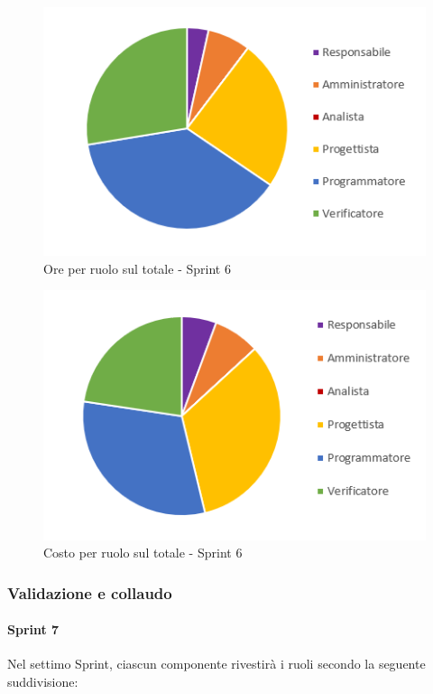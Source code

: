 \begin{figure}[H]
  \centering
  \includegraphics[scale=0.8]{immagini/6Sprint_oreRuolo.png}
  \caption{Ore per ruolo sul totale - Sprint 6}
\end{figure}

\begin{figure}[H]
  \centering
  \includegraphics[scale=0.8]{immagini/6Sprint_costoRuolo.png}
  \caption{Costo per ruolo sul totale - Sprint 6}
\end{figure}
\pagebreak


\subsubsection{Validazione e collaudo} \label{subsubsection:preventivo_validazione}
\paragraph{Sprint 7} \label{paragraph:preventivo_sprint7}
Nel settimo Sprint\glo{}, ciascun componente rivestirà i ruoli secondo la seguente suddivisione:

